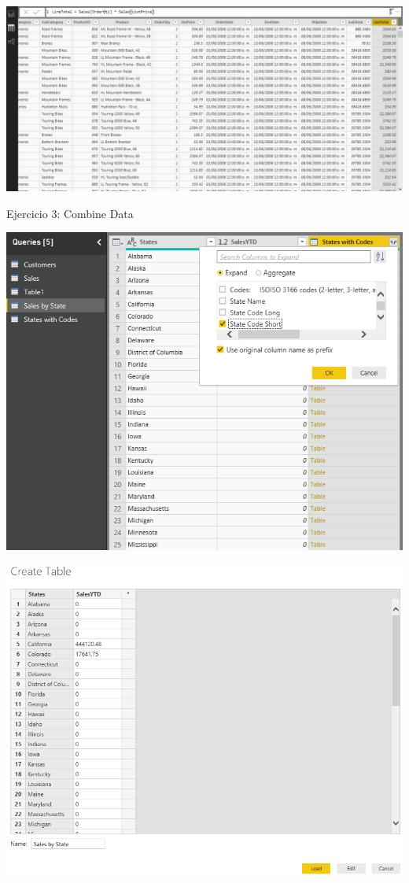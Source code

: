 	\begin{center}
	\includegraphics[width=15cm]{./Imagenes/power12}
	\end{center}	
\pagebreak
Ejercicio 3: Combine Data\\
	\begin{center}
	\includegraphics[width=15cm]{./Imagenes/power13}
	\end{center}	

	\begin{center}
	\includegraphics[width=15cm]{./Imagenes/power14}
	\end{center}	

